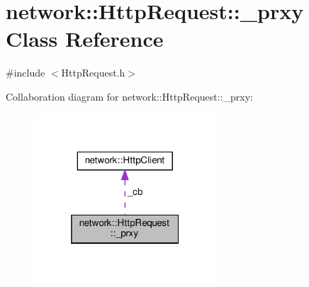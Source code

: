 \hypertarget{classnetwork_1_1HttpRequest_1_1__prxy}{}\section{network\+:\+:Http\+Request\+:\+:\+\_\+prxy Class Reference}
\label{classnetwork_1_1HttpRequest_1_1__prxy}


{\ttfamily \#include $<$Http\+Request.\+h$>$}



Collaboration diagram for network\+:\+:Http\+Request\+:\+:\+\_\+prxy\+:
\nopagebreak
\begin{figure}[H]
\begin{center}
\leavevmode
\includegraphics[width=193pt]{classnetwork_1_1HttpRequest_1_1__prxy__coll__graph}
\end{center}
\end{figure}
